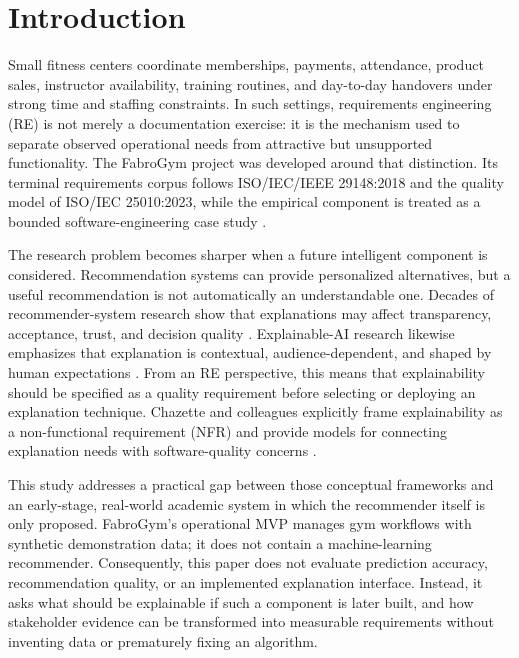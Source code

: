 \documentclass[pdflatex,sn-basic]{sn-jnl}
\begin{document}
\maketitle

\section{Introduction}\label{sec:intro}
Small fitness centers coordinate memberships, payments, attendance, product sales, instructor availability, training routines, and day-to-day handovers under strong time and staffing constraints. In such settings, requirements engineering (RE) is not merely a documentation exercise: it is the mechanism used to separate observed operational needs from attractive but unsupported functionality. The FabroGym project was developed around that distinction. Its terminal requirements corpus follows ISO/IEC/IEEE 29148:2018 and the quality model of ISO/IEC 25010:2023, while the empirical component is treated as a bounded software-engineering case study \cite{iso29148,iso25010,pohl2010,swebok2024,runeson2009,wohlin2012}.

The research problem becomes sharper when a future intelligent component is considered. Recommendation systems can provide personalized alternatives, but a useful recommendation is not automatically an understandable one. Decades of recommender-system research show that explanations may affect transparency, acceptance, trust, and decision quality \cite{herlocker2000,gedikli2014,zhangchen2020}. Explainable-AI research likewise emphasizes that explanation is contextual, audience-dependent, and shaped by human expectations \cite{miller2019,ribeiro2016,sokol2020}. From an RE perspective, this means that explainability should be specified as a quality requirement before selecting or deploying an explanation technique. Chazette and colleagues explicitly frame explainability as a non-functional requirement (NFR) and provide models for connecting explanation needs with software-quality concerns \cite{chazette2020,chazette2021,chazette2022}.

This study addresses a practical gap between those conceptual frameworks and an early-stage, real-world academic system in which the recommender itself is only proposed. FabroGym's operational MVP manages gym workflows with synthetic demonstration data; it does not contain a machine-learning recommender. Consequently, this paper does not evaluate prediction accuracy, recommendation quality, or an implemented explanation interface. Instead, it asks what should be explainable if such a component is later built, and how stakeholder evidence can be transformed into measurable requirements without inventing data or prematurely fixing an algorithm.
\end{document}
